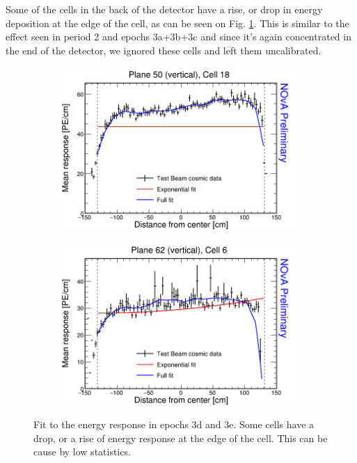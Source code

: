 Some of the cells in the back of the detector have a rise, or drop in energy deposition at the edge of the cell, as can be seen on Fig. \ref{fig:AttenfitResultsEpoch3de_CellEdges}. This is similar to the effect seen in period 2 and epochs 3a+3b+3c and since it's again concentrated in the end of the detector, we ignored these cells and left them uncalibrated.

\begin{figure}[h]
  \begin{subfigure}{0.5\textwidth}
    \includegraphics[width=\linewidth]{RelativeCalibrationResults/ep3de_050_018.png}
  \end{subfigure}
  \begin{subfigure}{0.5\textwidth}
    \includegraphics[width=\linewidth]{RelativeCalibrationResults/ep3de_062_006.png}
  \end{subfigure}
  \caption{Fit to the energy response in epochs 3d and 3e. Some cells have a drop, or a rise of energy response at the edge of the cell. This can be cause by low statistics.}
  \label{fig:AttenfitResultsEpoch3de_CellEdges}
\end{figure}

